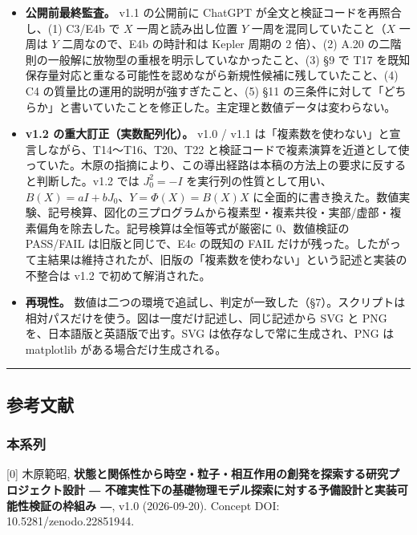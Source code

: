 \documentclass[
  a4paper,
]{ltjsarticle}
\begin{document}
\begin{itemize}
  は修正指示が適用されないまま公開に至ったことによる。検算した Claude
  Code は (1)(3)(6)
  に適用中に気づいていたが、警告せずに付記にとどめていた。
\item
  \textbf{公開前最終監査。} v1.1 の公開前に ChatGPT
  が全文と検証コードを再照合し、(1) C3/E4b で \(X\) 一周と読み出し位置
  \(Y\) 一周を混同していたこと（\(X\) 一周は \(Y\) 二周なので、E4b
  の時計和は Kepler 周期の 2 倍）、(2) A.20
  の二階則の一般解に放物型の重根を明示していなかったこと、(3) §9 で T17
  を既知保存量対応と重なる可能性を認めながら新規性候補に残していたこと、(4)
  C4 の質量比の運用的説明が強すぎたこと、(5) §11
  の三条件に対して「どちらか」と書いていたことを修正した。主定理と数値データは変わらない。
\item
  \textbf{v1.2 の重大訂正（実数配列化）。} v1.0 / v1.1
  は「複素数を使わない」と宣言しながら、T14〜T16、T20、T22
  と検証コードで複素演算を近道として使っていた。木原の指摘により、この導出経路は本稿の方法上の要求に反すると判断した。v1.2
  では \(J_0^2=-I\)
  を実行列の性質として用い、\(B(X)=aI+bJ_0\)、\(Y=\Phi(X)=B(X)X\)
  に全面的に書き換えた。数値実験、記号検算、図化の三プログラムから複素型・複素共役・実部/虚部・複素偏角を除去した。記号検算は全恒等式が厳密に
  0、数値検証の PASS/FAIL は旧版と同じで、E4c の既知の FAIL
  だけが残った。したがって主結果は維持されたが、旧版の「複素数を使わない」という記述と実装の不整合は
  v1.2 で初めて解消された。
\item
  \textbf{再現性。}
  数値は二つの環境で追試し、判定が一致した（§7）。スクリプトは相対パスだけを使う。図は一度だけ記述し、同じ記述から
  SVG と PNG を、日本語版と英語版で出す。SVG
  は依存なしで常に生成され、PNG は matplotlib がある場合だけ生成される。
\end{itemize}

\begin{center}\rule{0.5\linewidth}{0.5pt}\end{center}

\subsection{参考文献}\label{ux53c2ux8003ux6587ux732e}

\subsubsection{本系列}\label{ux672cux7cfbux5217}

{[}0{]} 木原範昭,
\textbf{状態と関係性から時空・粒子・相互作用の創発を探索する研究プロジェクト設計
― 不確実性下の基礎物理モデル探索に対する予備設計と実装可能性検証の枠組み
―}, v1.0 (2026-09-20). Concept DOI: 10.5281/zenodo.22851944.
\end{document}
